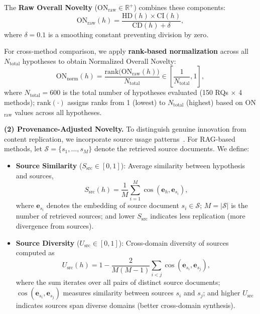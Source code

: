 \documentclass[runningheads]{llncs}
\begin{document}
The \textbf{Raw Overall Novelty} ($\text{ON}_{\text{raw}} \in \mathbb{R}^+$) combines these components:
\begin{equation}
   \text{ON}_{\text{raw}}(h) = \frac{\text{HD}(h) \times \text{CI}(h)}{\text{CD}(h) + \delta},
   \label{eq:on_raw}
\end{equation}
where $\delta = 0.1$ is a smoothing constant preventing division by zero.

For cross-method comparison, we apply \textbf{rank-based normalization} across all $N_{\text{total}}$ hypotheses to obtain Normalized Overall Novelty:
\begin{equation}
    \text{ON}_{\text{norm}}(h) = \frac{\text{rank}\big(\text{ON}_{\text{raw}}(h)\big)}{N_{\text{total}}} \in \left[\frac{1}{N_{\text{total}}}, 1\right],
    \label{eq:on_norm}
\end{equation}
where $N_{\text{total}} = 600$ is the total number of hypotheses evaluated (150 RQs $\times$ 4 methods); $\text{rank}(\cdot)$ assigns ranks from 1 (lowest) to $N_{\text{total}}$ (highest) based on ON$_{\text{raw}}$ values across all hypotheses.

\textbf{(2) Provenance-Adjusted Novelty.} To distinguish genuine innovation from content replication, we incorporate source usage patterns~\cite{lewis2020retrieval}. For RAG-based methods, let $\mathcal{S} = \{s_1, \ldots, s_M\}$ denote the retrieved source documents. We define:

\begin{itemize}[leftmargin=*, itemsep=2pt]
    \item \textbf{Source Similarity} ($S_{\text{src}} \in [0, 1]$): Average similarity between hypothesis and sources,
    \begin{equation}
        S_{\text{src}}(h) = \frac{1}{M} \sum_{i=1}^{M} \cos(\mathbf{e}_h, \mathbf{e}_{s_i}),
        \label{eq:s_src}
    \end{equation}
    where $\mathbf{e}_{s_i}$ denotes the embedding of source document $s_i \in \mathcal{S}$; $M = |\mathcal{S}|$ is the number of retrieved sources; and lower $S_{\text{src}}$ indicates less replication (more divergence from sources).
    
    \item \textbf{Source Diversity} ($U_{\text{src}} \in [0, 1]$): Cross-domain diversity of sources computed as~\cite{zeng2021fresh,shi2023surprising}
    \begin{equation}
        U_{\text{src}}(h) = 1 - \frac{2}{M(M-1)} \sum_{i<j} \cos(\mathbf{e}_{s_i}, \mathbf{e}_{s_j}),
        \label{eq:u_src}
    \end{equation}
    where the sum iterates over all pairs of distinct source documents; $\cos(\mathbf{e}_{s_i}, \mathbf{e}_{s_j})$ measures similarity between sources $s_i$ and $s_j$; and higher $U_{\text{src}}$ indicates sources span diverse domains (better cross-domain synthesis).
\end{itemize}
\end{document}
